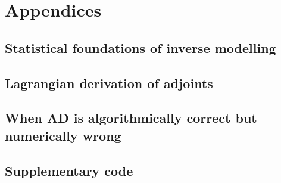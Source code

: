 \documentclass[12pt]{article}
\begin{document}

% 

\newpage
\appendix
\section*{Appendices}
\renewcommand{\thesubsection}{\Alph{subsection}}

\subsection{Statistical foundations of inverse modelling}
% 
\newpage
\subsection{Lagrangian derivation of adjoints}

\newpage
\subsection{When AD is algorithmically correct but numerically wrong}

\newpage
\subsection{Supplementary code}



\newpage

\printbibliography[heading=bibintoc, title={References}]
\end{document}
